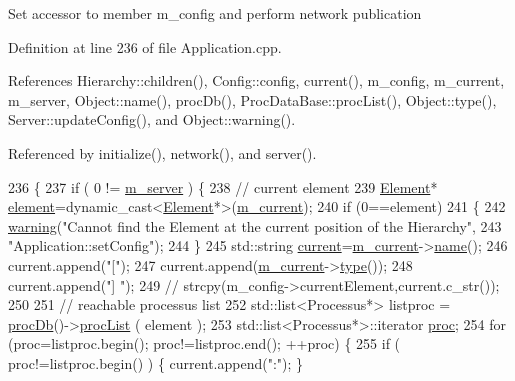 Set accessor to member m\+\_\+config and perform network publication 

Definition at line 236 of file Application.\+cpp.



References Hierarchy\+::children(), Config\+::config, current(), m\+\_\+config, m\+\_\+current, m\+\_\+server, Object\+::name(), proc\+Db(), Proc\+Data\+Base\+::proc\+List(), Object\+::type(), Server\+::update\+Config(), and Object\+::warning().



Referenced by initialize(), network(), and server().


\begin{DoxyCode}
236                              \{
237   \textcolor{keywordflow}{if} ( 0 != \hyperlink{classApplication_a5e6085b0f322d5036177b16113a75b56}{m\_server} ) \{
238     \textcolor{comment}{// current element}
239     \hyperlink{classElement}{Element}* \hyperlink{namespaceelement}{element}=\textcolor{keyword}{dynamic\_cast<}\hyperlink{classElement}{Element}*\textcolor{keyword}{>}(\hyperlink{classApplication_ab0fd877a3c66c41b22109863e1719ccd}{m\_current});
240     \textcolor{keywordflow}{if} (0==element)
241       \{
242     \hyperlink{classObject_a65cd4fda577711660821fd2cd5a3b4c9}{warning}(\textcolor{stringliteral}{"Cannot find the Element at the current position of the Hierarchy"},
243         \textcolor{stringliteral}{"Application::setConfig"});
244       \}
245     std::string \hyperlink{classApplication_af25c880ff1e95d863ed058396754a76e}{current}=\hyperlink{classApplication_ab0fd877a3c66c41b22109863e1719ccd}{m\_current}->\hyperlink{classObject_a300f4c05dd468c7bb8b3c968868443c1}{name}();
246     current.append(\textcolor{stringliteral}{"["});
247     current.append(\hyperlink{classApplication_ab0fd877a3c66c41b22109863e1719ccd}{m\_current}->\hyperlink{classObject_a84f99f70f144a83e1582d1d0f84e4e62}{type}());
248     current.append(\textcolor{stringliteral}{"] "});
249     \textcolor{comment}{//    strcpy(m\_config->currentElement,current.c\_str());}
250 
251     \textcolor{comment}{// reachable processus list}
252     std::list<Processus*> listproc = \hyperlink{classApplication_aa5c28af1a7e1c41dada2db2a4d03c57d}{procDb}()->\hyperlink{classProcDataBase_a8145de34e9857f3f6eebd2572740f198}{procList} ( element );
253     std::list<Processus*>::iterator \hyperlink{namespaceproc}{proc};
254     \textcolor{keywordflow}{for} (proc=listproc.begin(); proc!=listproc.end(); ++proc) \{
255       \textcolor{keywordflow}{if} ( proc!=listproc.begin() ) \{ current.append(\textcolor{stringliteral}{":"}); \}

\end{DoxyCode}
